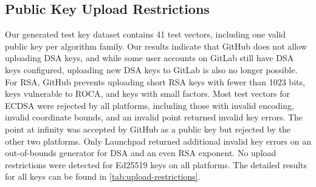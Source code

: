 \subsection{Public Key Upload Restrictions}
\label{subsec:upload-restrictions}

Our generated test key dataset contains 41 test vectors, including one valid public key per algorithm family. Our results indicate that GitHub does not allow uploading DSA keys, and while some user accounts on GitLab still have DSA keys configured, uploading new DSA keys to GitLab is also no longer possible. For RSA, GitHub prevents uploading short RSA keys with fewer than 1023 bits, keys vulnerable to ROCA, and keys with small factors. Most test vectors for ECDSA were rejected by all platforms, including those with invalid encoding, invalid coordinate bounds, and an invalid point returned invalid key errors. The point at infinity was accepted by GitHub as a public key but rejected by the other two platforms. Only Launchpad returned additional invalid key errors on an out-of-bounds generator for DSA and an even RSA exponent. No upload restrictions were detected for Ed25519 keys on all platforms. The detailed results for all keys can be found in \autoref{tab:upload-restrictions}.

